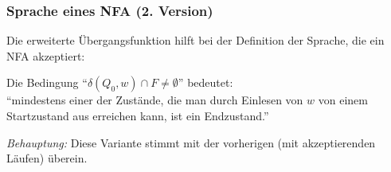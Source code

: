 \documentclass[aspectratio=1610,onlymath]{beamer}
\begin{document}
\begin{frame}\frametitle{Sprache eines NFA (2. Version)}

Die erweiterte Übergangsfunktion hilft bei der Definition der Sprache, die ein NFA akzeptiert:
\bigskip


Die Bedingung \alert{"`$\delta(Q_0,w)\cap F \neq \emptyset$"'} bedeutet:\\[1ex] \alert{"`mindestens einer der Zustände, die man durch Einlesen von $w$ von einem Startzustand aus erreichen kann, ist ein Endzustand."'}

\bigskip

\emph{Behauptung:} Diese Variante stimmt mit der vorherigen (mit akzeptierenden Läufen) überein.

% 

\end{frame}
\end{document}
